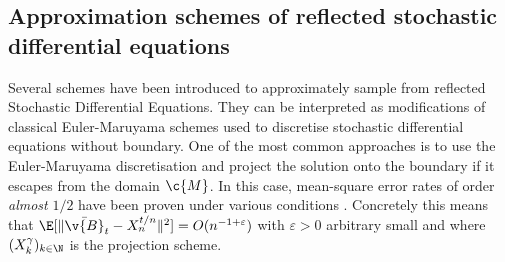 
\subsection{Approximation schemes of reflected stochastic differential equations}
Several schemes have been introduced to approximately sample from reflected Stochastic Differential Equations.
They can be interpreted as modifications of classical Euler-Maruyama schemes used to discretise stochastic differential equations without boundary.
One of the most common approaches is to use the Euler-Maruyama discretisation and project the solution onto the boundary if it escapes from the domain \(\c{M}\).
In this case, mean-square error rates of order \emph{almost} \(1/2\) have been proven under various conditions \parencite{liu1995discretization,chitashvili1981strong,pettersson1995approximations,slominski1994approximation}.
Concretely this means that \(\E[\| \bar{\v{B}}_{t} - X_{n}^{t/n}\|^2] = O(n^{-1+\varepsilon})\) with \(\varepsilon>0\) arbitrary small and where \((X_k^\gamma)_{k \in \N}\) is the projection scheme.

